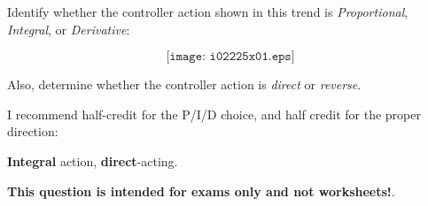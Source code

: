

Identify whether the controller action shown in this trend is {\it Proportional}, {\it Integral}, or {\it Derivative}:

$$\texttt{[image: i02225x01.eps]}$$

Also, determine whether the controller action is {\it direct} or {\it reverse}.







I recommend half-credit for the P/I/D choice, and half credit for the proper direction:

\vskip 10pt

{\bf Integral} action, {\bf direct}-acting.







{\bf This question is intended for exams only and not worksheets!}.



